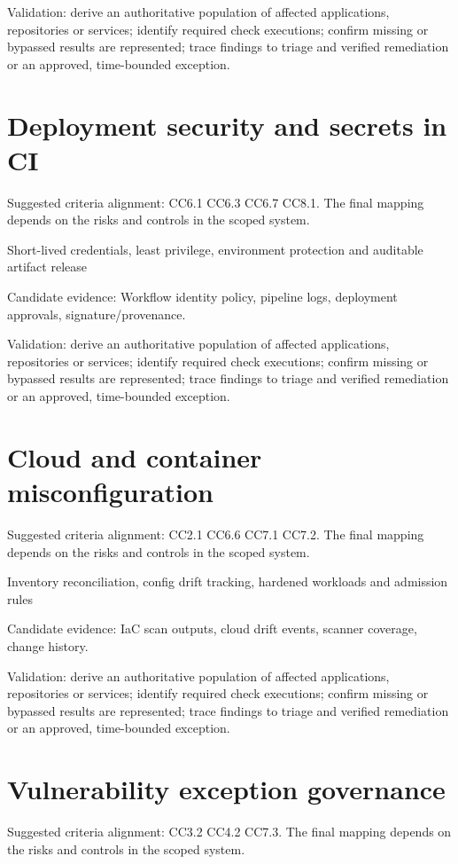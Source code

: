 \documentclass[10pt,oneside]{report}
\begin{document}
Validation: derive an authoritative population of affected applications, repositories or services; identify required check executions; confirm missing or bypassed results are represented; trace findings to triage and verified remediation or an approved, time-bounded exception.

\section{Deployment security and secrets in CI}
Suggested criteria alignment: CC6.1 CC6.3 CC6.7 CC8.1. The final mapping depends on the risks and controls in the scoped system.

\begin{engineeringbox}
Short-lived credentials, least privilege, environment protection and auditable artifact release
\end{engineeringbox}
Candidate evidence: Workflow identity policy, pipeline logs, deployment approvals, signature/provenance.

Validation: derive an authoritative population of affected applications, repositories or services; identify required check executions; confirm missing or bypassed results are represented; trace findings to triage and verified remediation or an approved, time-bounded exception.

\section{Cloud and container misconfiguration}
Suggested criteria alignment: CC2.1 CC6.6 CC7.1 CC7.2. The final mapping depends on the risks and controls in the scoped system.

\begin{engineeringbox}
Inventory reconciliation, config drift tracking, hardened workloads and admission rules
\end{engineeringbox}
Candidate evidence: IaC scan outputs, cloud drift events, scanner coverage, change history.

Validation: derive an authoritative population of affected applications, repositories or services; identify required check executions; confirm missing or bypassed results are represented; trace findings to triage and verified remediation or an approved, time-bounded exception.

\section{Vulnerability exception governance}
Suggested criteria alignment: CC3.2 CC4.2 CC7.3. The final mapping depends on the risks and controls in the scoped system.
\end{document}
